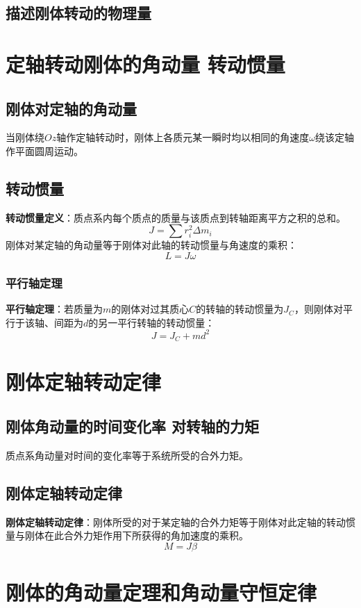     \subsection{描述刚体转动的物理量}

\section{定轴转动刚体的角动量 转动惯量}
    \subsection{刚体对定轴的角动量}
    当刚体绕$Oz$轴作定轴转动时，刚体上各质元某一瞬时均以相同的角速度$\omega$绕该定轴作平面圆周运动。
    \subsection{转动惯量}
    \textbf{转动惯量定义}：质点系内每个质点的质量与该质点到转轴距离平方之积的总和。
    \[
    J = \sum r_i^2 \Delta m_i
    \]
    刚体对某定轴的角动量等于刚体对此轴的转动惯量与角速度的乘积：
    \[
    L = J\omega
    \]

    \subsubsection{平行轴定理}
    \textbf{平行轴定理}：若质量为$m$的刚体对过其质心$C$的转轴的转动惯量为$J_C$，则刚体对平行于该轴、间距为$d$的另一平行转轴的转动惯量：
    \[
    J = J_C + md^2
    \]

\section{刚体定轴转动定律}
    \subsection{刚体角动量的时间变化率 对转轴的力矩}
    质点系角动量对时间的变化率等于系统所受的合外力矩。
    \subsection{刚体定轴转动定律}
    \textbf{刚体定轴转动定律}：刚体所受的对于某定轴的合外力矩等于刚体对此定轴的转动惯量与刚体在此合外力矩作用下所获得的角加速度的乘积。
    \[
    M = J\beta
    \]

\section{刚体的角动量定理和角动量守恒定律}
